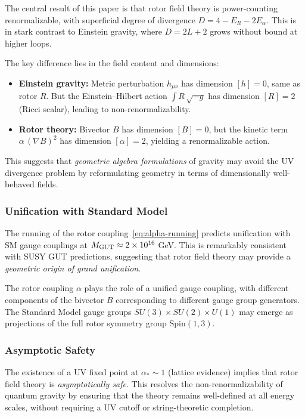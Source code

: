 \documentclass[11pt,a4paper]{article}
\numberwithin{equation}{section}
\theoremstyle{plain}
\theoremstyle{definition}
\theoremstyle{remark}
\newcommand{\Spin}{\mathrm{Spin}}
\begin{document}
The central result of this paper is that rotor field theory is power-counting renormalizable, with superficial degree of divergence $D=4-E_R-2E_\alpha$. This is in stark contrast to Einstein gravity, where $D=2L+2$ grows without bound at higher loops.

The key difference lies in the field content and dimensions:
\begin{itemize}
  \item \textbf{Einstein gravity:} Metric perturbation $h_{\mu\nu}$ has dimension $[h]=0$, same as rotor $R$. But the Einstein--Hilbert action $\int R\,\sqrt{-g}$ has dimension $[R]=2$ (Ricci scalar), leading to non-renormalizability.
  \item \textbf{Rotor theory:} Bivector $B$ has dimension $[B]=0$, but the kinetic term $\alpha\,(\nabla B)^2$ has dimension $[\alpha]=2$, yielding a renormalizable action.
\end{itemize}

This suggests that \emph{geometric algebra formulations} of gravity may avoid the UV divergence problem by reformulating geometry in terms of dimensionally well-behaved fields.

\subsubsection{Unification with Standard Model}

The running of the rotor coupling~\eqref{eq:alpha-running} predicts unification with SM gauge couplings at $M_{\rm GUT}\approx 2\times 10^{16}$ GeV. This is remarkably consistent with SUSY GUT predictions, suggesting that rotor field theory may provide a \emph{geometric origin of grand unification}.

The rotor coupling $\alpha$ plays the role of a unified gauge coupling, with different components of the bivector $B$ corresponding to different gauge group generators. The Standard Model gauge groups $SU(3)\times SU(2)\times U(1)$ may emerge as projections of the full rotor symmetry group $\Spin(1,3)$.

\subsubsection{Asymptotic Safety}

The existence of a UV fixed point at $\alpha_*\sim 1$ (lattice evidence) implies that rotor field theory is \emph{asymptotically safe}. This resolves the non-renormalizability of quantum gravity by ensuring that the theory remains well-defined at all energy scales, without requiring a UV cutoff or string-theoretic completion.
\end{document}
